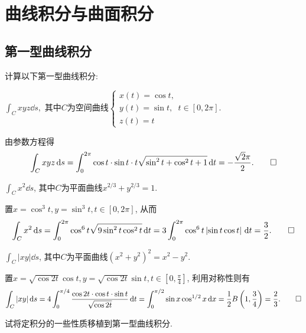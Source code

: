 \chapter{曲线积分与曲面积分}
\section{第一型曲线积分}
\begin{quiza}
\woe 计算以下第一型曲线积分:
\begin{quizcs}
\item \(\int_Cxyz\dd s,\) 其中\(C\)为空间曲线\(\begin{cases}
x(t)=\cos t,\\y(t)=\sin t,\\z(t)=t
\end{cases}t\in[0,2\pi]\).
\begin{solution}
由参数方程得
\[\int_Cxyz\,\mathrm{d} s=\int_{0}^{2\pi}\cos t\cdot\sin t\cdot t\sqrt{\sin^2 t+\cos^2 t+1}\,\mathrm{d} t=-\frac{\sqrt{2}\pi}{2}.\qedhere\]
\end{solution}
\item \(\int_Cx^2\dd s\), 其中\(C\)为平面曲线\(x^{2/3}+ y^{2/3}=1.\)
\begin{solution}
置\(x=\cos^3t,y=\sin^3t,t\in[0,2\pi]\), 从而\[\int_Cx^2\,\mathrm{d} s=\int_{0}^{2\pi}\cos^6t\sqrt{9\sin^2t\cos^2t}\,\mathrm{d} t=3\int_{0}^{2\pi}\cos^6t\left|\sin t\cos t\right|\,\mathrm{d} t=\frac{3}{2}.\qedhere\]
\end{solution}
\item \(\int_C|xy|\dd s\), 其中\(C\)为平面曲线\((x^2+y^2)^2=x^2-y^2\).
\begin{solution}
置\(x=\sqrt{\cos 2t}\cos t,y=\sqrt{\cos 2t}\sin t,t\in\left[0,\frac{\pi}{4}\right]\), 利用对称性则有\[\int_C|xy|\,\mathrm{d} s=4\int_{0}^{\pi/4}\frac{\cos 2t\cdot\cos t\cdot\sin t}{\sqrt{\cos 2t}}\,\mathrm{d} t=\int_{0}^{\pi/2}\sin x\cos^{1/2}x\,\mathrm{d} x=\frac{1}{2}B\left(1,\frac{3}{4}\right)=\frac{2}{3}.\qedhere\]
\end{solution}
\end{quizcs}
\end{quiza}
\begin{quizb}
\woe 试将定积分的一些性质移植到第一型曲线积分.
\begin{solution}

\end{solution}
\end{quizb}
